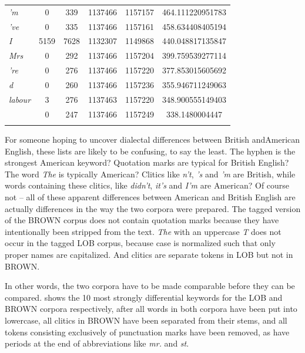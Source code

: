 \begin{table}
{\begin{tabular}[t]{l *{2}{S[table-format=4]} *{2}{S[table-format=7]} S[table-format=6.2]}
\textit{'m} & 0 & 339 & 1137466 & 1157157 & 464.111220951783 \\
\textit{'ve} & 0 & 335 & 1137466 & 1157161 & 458.634408405194 \\
\textit{I} & 5159 & 7628 & 1132307 & 1149868 & 440.048817135847 \\
\textit{Mrs} & 0 & 292 & 1137466 & 1157204 & 399.759539277114 \\
\textit{'re} & 0 & 276 & 1137466 & 1157220 & 377.853015605692 \\
\textit{d} & 0 & 260 & 1137466 & 1157236 & 355.946711249063 \\
\textit{labour} & 3 & 276 & 1137463 & 1157220 & 348.900555149403 \\
\textit{~} & 0 & 247 & 1137466 & 1157249 & 338.1480004447 \\
\lspbottomrule
\end{tabular}}
\end{table}

For someone hoping to uncover dialectal differences between British  and\linebreak American  English, these lists are likely to be confusing, to say the least. The hyphen is the strongest American keyword?  Quotation marks are typical for British English? The word \textit{The} is typically American? Clitics  like \textit{n't}, \textit{'s} and \textit{'m} are British, while words containing these clitics,  like \textit{didn't}, \textit{it's} and \textit{I'm} are American? Of course not -- all of these apparent differences between American  and British English are actually differences in the way the two corpora were prepared. The tagged version of the BROWN  corpus does not contain quotation marks because they have intentionally been stripped from the text. \textit{The} with an uppercase \textit{T} does not occur in the tagged LOB  corpus, because case is normalized such that only proper names are capitalized. And clitics  are separate tokens  in LOB but not in  BROWN.

In other words, the two corpora have to be made comparable before they can be compared.  shows the 10 most strongly differential keywords  for the LOB  and BROWN  corpora respectively, after all words in both corpora have been put into lowercase, all clitics  in BROWN  have been separated from their stems,  and all tokens  consisting exclusively of punctuation marks have been removed, as have periods at the end of abbreviations like \textit{mr.} and \textit{st}.

